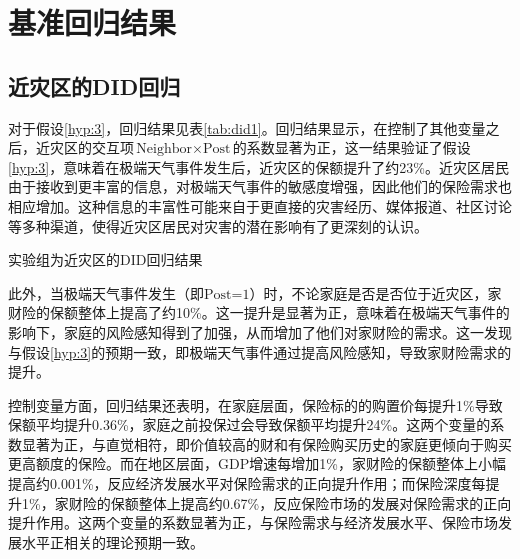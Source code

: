 \section{基准回归结果}

%     

\subsection{近灾区的DID回归}
对于假设\ref{hyp:3}，回归结果见表\ref{tab:did1}。回归结果显示，在控制了其他变量之后，近灾区的交互项$\text{Neighbor}\times \text{Post}$的系数显著为正，这一结果验证了假设\ref{hyp:3}，意味着在极端天气事件发生后，近灾区的保额提升了约23\%。近灾区居民由于接收到更丰富的信息，对极端天气事件的敏感度增强，因此他们的保险需求也相应增加。这种信息的丰富性可能来自于更直接的灾害经历、媒体报道、社区讨论等多种渠道，使得近灾区居民对灾害的潜在影响有了更深刻的认识。
\begin{table}[H]
    \centering
    \caption{实验组为近灾区的DID回归结果}\label{tab:did1}
    
\end{table}

此外，当极端天气事件发生（即$\text{Post=1}$）时，不论家庭是否是否位于近灾区，家财险的保额整体上提高了约10\%。这一提升是显著为正，意味着在极端天气事件的影响下，家庭的风险感知得到了加强，从而增加了他们对家财险的需求。这一发现与假设\ref{hyp:3}的预期一致，即极端天气事件通过提高风险感知，导致家财险需求的提升。

控制变量方面，回归结果还表明，在家庭层面，保险标的的购置价每提升1\%导致保额平均提升0.36\%，家庭之前投保过会导致保额平均提升24\%。这两个变量的系数显著为正，与直觉相符，即价值较高的财和有保险购买历史的家庭更倾向于购买更高额度的保险。而在地区层面，GDP增速每增加1\%，家财险的保额整体上小幅提高约0.001\%，反应经济发展水平对保险需求的正向提升作用\citep{JJYJ200401002,arena2008does}；而保险深度每提升1\%，家财险的保额整体上提高约0.67\%，反应保险市场的发展对保险需求的正向提升作用\citep{JRYJ200706018}。这两个变量的系数显著为正，与保险需求与经济发展水平、保险市场发展水平正相关的理论预期一致。


